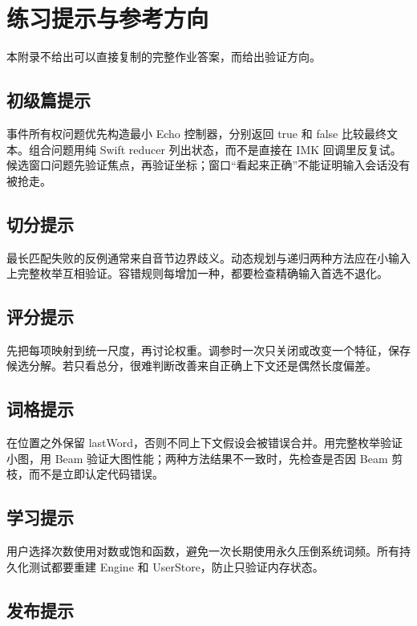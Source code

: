 \chapter{练习提示与参考方向}

本附录不给出可以直接复制的完整作业答案，而给出验证方向。

\section{初级篇提示}

事件所有权问题优先构造最小 Echo 控制器，分别返回 true 和 false 比较最终文本。组合问题用纯 Swift reducer 列出状态，而不是直接在 IMK 回调里反复试。候选窗口问题先验证焦点，再验证坐标；窗口“看起来正确”不能证明输入会话没有被抢走。

\section{切分提示}

最长匹配失败的反例通常来自音节边界歧义。动态规划与递归两种方法应在小输入上完整枚举互相验证。容错规则每增加一种，都要检查精确输入首选不退化。

\section{评分提示}

先把每项映射到统一尺度，再讨论权重。调参时一次只关闭或改变一个特征，保存候选分解。若只看总分，很难判断改善来自正确上下文还是偶然长度偏差。

\section{词格提示}

在位置之外保留 lastWord，否则不同上下文假设会被错误合并。用完整枚举验证小图，用 Beam 验证大图性能；两种方法结果不一致时，先检查是否因 Beam 剪枝，而不是立即认定代码错误。

\section{学习提示}

用户选择次数使用对数或饱和函数，避免一次长期使用永久压倒系统词频。所有持久化测试都要重建 Engine 和 UserStore，防止只验证内存状态。

\section{发布提示}

